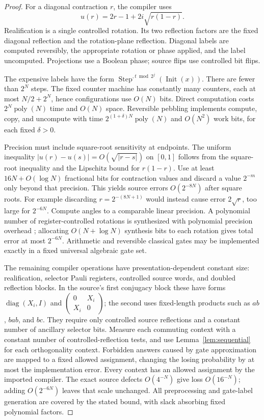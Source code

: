 \begin{proof}
For a diagonal contraction $r$, the compiler uses
\[
 u(r)=2r-1+2i\sqrt{r(1-r)}.
\]
Realification is a single controlled rotation. Its two reflection
factors are the fixed diagonal reflection and the rotation-plane
reflection. Diagonal labels are computed reversibly, the appropriate
rotation or phase applied, and the label uncomputed. Projections use
a Boolean phase; source flips use controlled bit flips.

The expensive labels have the form
$\operatorname{Step}^{,t\bmod2^j}(\operatorname{Init}(x))$.
There are fewer than $2^N$ steps. The fixed counter machine has
constantly many counters, each at most $N/2+2^N$, hence configurations
use $O(N)$ bits. Direct computation costs
$2^N\operatorname{poly}(N)$ time and $O(N)$ space. Reversible
pebbling \cite{bennett} implements compute, copy, and uncompute with
time $2^{(1+\delta)N}\operatorname{poly}(N)$ and $O(N^2)$ work
bits, for each fixed $\delta>0$.

Precision must include square-root sensitivity at endpoints. The
uniform inequality $|u(r)-u(s)|=O(\sqrt{|r-s|})$ on $[0,1]$ follows
from the square-root inequality and the Lipschitz bound for $r(1-r)$.
Use at least $16N+O(\log N)$ fractional bits for contraction values
and discard a value $2^{-m}$ only beyond that precision. This yields
source errors $O(2^{-8N})$ after square roots. For example discarding
$r=2^{-(8N+1)}$ would instead cause error $2\sqrt r$, too large for
$2^{-6N}$. Compute angles to a comparable linear precision. A
polynomial number of register-controlled rotations is synthesized
with polynomial precision overhead \cite{dawson}; allocating
$O(N+\log N)$ synthesis bits to each rotation gives total error at
most $2^{-6N}$. Arithmetic and reversible classical gates may be
implemented exactly in a fixed universal algebraic gate set.

The remaining compiler operations have presentation-dependent constant
size: realification, selector Pauli registers, controlled source words,
and doubled reflection blocks. In the source's first conjugacy block
these have forms $\operatorname{diag}(X_i,I)$ and
$\left(\begin{smallmatrix}0&X_i\\X_i&0\end{smallmatrix}\right)$;
the second uses fixed-length products such as $ab$, $bab$, and $bc$.
They require only controlled source reflections and a constant number
of ancillary selector bits. Measure each commuting context with a
constant number of controlled-reflection tests, and use
Lemma~\ref{lem:sequential} for each orthogonality context. Forbidden
answers caused by gate approximation are mapped to a fixed allowed
assignment, changing the losing probability by at most the
implementation error. Every context has an allowed assignment by the
imported compiler. The exact source defects $O(4^{-N})$ give loss
$O(16^{-N})$; adding $O(2^{-6N})$ leaves that scale unchanged.
All preprocessing and gate-label generation are covered by the stated
bound, with slack absorbing fixed polynomial factors.
\end{proof}

